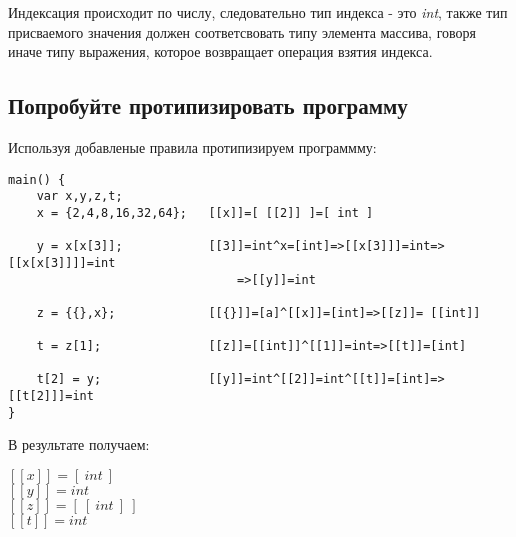 \documentclass{report}
\begin{document}
Индексация происходит по числу, следовательно тип индекса - это \textit{int}, также тип присваемого значения должен соответсвовать типу элемента массива, говоря иначе типу выражения, которое возвращает операция взятия индекса.

\newpage
\subsection{Попробуйте протипизировать программу}

Используя добавленые правила протипизируем программму:

\begingroup
\begin{center}
\begin{lstlisting}
main() {
    var x,y,z,t;
    x = {2,4,8,16,32,64};   [[x]]=[ [[2]] ]=[ int ]
    
    y = x[x[3]];            [[3]]=int^x=[int]=>[[x[3]]]=int=>[[x[x[3]]]]=int
                                =>[[y]]=int
                                
    z = {{},x};             [[{}]]=[a]^[[x]]=[int]=>[[z]]= [[int]]
    
    t = z[1];               [[z]]=[[int]]^[[1]]=int=>[[t]]=[int]
    
    t[2] = y;               [[y]]=int^[[2]]=int^[[t]]=[int]=>[[t[2]]]=int
}
\end{lstlisting}
\end{center}
\endgroup

В результате получаем:

\begin{center}
    \( [[x]] = [\ int\ ] \) \\
    \(  [[y]] = int \) \\
    \(  [[z]] = [\ [\ int\ ]\ ] \) \\
    \(  [[t]] = int \) \\
\end{center}
\end{document}
